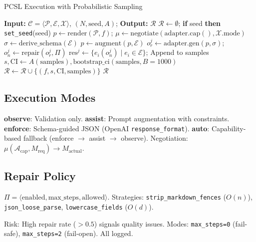 \documentclass[sigconf]{acmart}
\begin{document}
\begin{algorithm}[t]
\caption{PCSL Execution with Probabilistic Sampling}
\label{alg:pipeline}
\scriptsize
\begin{algorithmic}[1]
\STATE \textbf{Input:} \( \mathcal{C} = \langle \mathcal{P}, \mathcal{E}, \mathcal{X} \rangle \), \( (N, \text{seed}, A) \); \textbf{Output:} \( \mathcal{R} \)
\STATE \( \mathcal{R} \leftarrow \emptyset \); \textbf{if} seed \textbf{then} \texttt{set\_seed}(seed)
  \STATE \( p \leftarrow \text{render}(\mathcal{P}, f) \); \( \mu \leftarrow \text{negotiate}(\text{adapter.cap}(), \mathcal{X}.\text{mode}) \)
   \STATE \( \sigma \leftarrow \text{derive\_schema}(\mathcal{E}) \) \ENDIF
   \STATE \( p \leftarrow \text{augment}(p, \mathcal{E}) \) \ENDIF
    \STATE \( o_r^j \leftarrow \text{adapter.gen}(p, \sigma) \); \( o_n^j \leftarrow \text{repair}(o_r^j, \Pi) \)
    \STATE \( \text{res}^j \leftarrow \{e_i(o_n^j) \mid e_i \in \mathcal{E}\} \); Append to samples
  \ENDFOR
  \STATE \( s, \text{CI} \leftarrow A(\text{samples}), \text{bootstrap\_ci}(\text{samples}, B=1000) \)
  \STATE \( \mathcal{R} \leftarrow \mathcal{R} \cup \{(f, s, \text{CI}, \text{samples})\} \)
\ENDFOR
\RETURN \( \mathcal{R} \)
\end{algorithmic}
\end{algorithm}

\subsection{Execution Modes}

\textbf{observe}: Validation only. \textbf{assist}: Prompt augmentation with constraints. \textbf{enforce}: Schema-guided JSON (OpenAI \texttt{response\_format}). \textbf{auto}: Capability-based fallback (enforce \(\to\) assist \(\to\) observe). Negotiation: \( \mu(\mathcal{A}_{\text{cap}}, M_{\text{req}}) \to M_{\text{actual}} \).

\subsection{Repair Policy}

\( \Pi = \langle \text{enabled}, \text{max\_steps}, \text{allowed} \rangle \). Strategies: \texttt{strip\_markdown\_fences} (\( O(n) \)), \texttt{json\_loose\_parse}, \texttt{lowercase\_fields} (\( O(d) \)).

Risk: High repair rate (\( > 0.5 \)) signals quality issues. Modes: \texttt{max\_steps=0} (fail-safe), \texttt{max\_steps=2} (fail-open). All logged.
\end{document}
